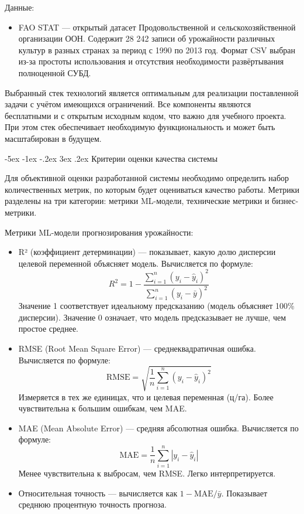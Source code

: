 \documentclass[14pt, a4paper]{extarticle}
\makeatletter
\renewcommand\subsection{\@startsection {subsection}{2}{\z@}%
    {-5ex \@plus -1ex \@minus -.2ex}%
    {3ex \@plus.2ex}%
    {\centering\large\bfseries}}
\makeatother
\begin{document}
    Данные:
    \begin{itemize}
        \item FAO STAT \cite{faostat} — открытый датасет Продовольственной и сельскохозяйственной организации ООН. Содержит 28 242 записи об урожайности различных культур в разных странах за период с 1990 по 2013 год. Формат CSV выбран из-за простоты использования и отсутствия необходимости развёртывания полноценной СУБД.
    \end{itemize}

    Выбранный стек технологий является оптимальным для реализации поставленной задачи с учётом имеющихся ограничений. Все компоненты являются бесплатными и с открытым исходным кодом, что важно для учебного проекта. При этом стек обеспечивает необходимую функциональность и может быть масштабирован в будущем.

\subsection{Критерии оценки качества системы}

    Для объективной оценки разработанной системы необходимо определить набор количественных метрик, по которым будет оцениваться качество работы. Метрики разделены на три категории: метрики ML-модели, технические метрики и бизнес-метрики.

    Метрики ML-модели прогнозирования урожайности:

    \begin{itemize}
        \item R² (коэффициент детерминации) — показывает, какую долю дисперсии целевой переменной объясняет модель. Вычисляется по формуле: 
        \[
        R^2 = 1 - \frac{\sum_{i=1}^{n}(y_i - \hat{y}_i)^2}{\sum_{i=1}^{n}(y_i - \bar{y})^2}
        \]
        Значение 1 соответствует идеальному предсказанию (модель объясняет 100\% дисперсии). Значение 0 означает, что модель предсказывает не лучше, чем простое среднее.

        \item RMSE (Root Mean Square Error) — среднеквадратичная ошибка. Вычисляется по формуле:
        \[
        \text{RMSE} = \sqrt{\frac{1}{n}\sum_{i=1}^{n}(y_i - \hat{y}_i)^2}
        \]
        Измеряется в тех же единицах, что и целевая переменная (ц/га). Более чувствительна к большим ошибкам, чем MAE.

        \item MAE (Mean Absolute Error) — средняя абсолютная ошибка. Вычисляется по формуле:
        \[
        \text{MAE} = \frac{1}{n}\sum_{i=1}^{n}|y_i - \hat{y}_i|
        \]
        Менее чувствительна к выбросам, чем RMSE. Легко интерпретируется.

        \item Относительная точность — вычисляется как $1 - \text{MAE}/\bar{y}$. Показывает среднюю процентную точность прогноза.
    \end{itemize}
\end{document}
